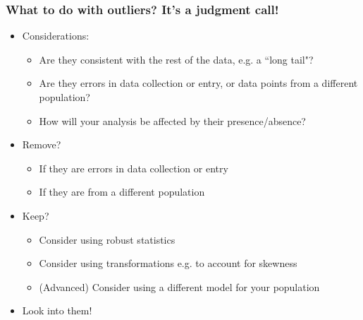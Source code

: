\documentclass[11pt,containsverbatim,handout]{beamer}
\begin{document}

\begin{frame}
\frametitle{What to do with outliers? It's a judgment call!}
\begin{itemize}
  \item Considerations:
  \begin{itemize}
    \item Are they consistent with the rest of the data, e.g. a ``long tail"?
    \item Are they errors in data collection or entry, or data points from a different population?
    \item How will your analysis be affected by their presence/absence?
  \end{itemize}
  \item Remove?
  \begin{itemize}
    \item If they are errors in data collection or entry
    \item If they are from a different population
  \end{itemize}
  \item Keep?
  \begin{itemize}
    \item Consider using robust statistics
    \item Consider using transformations e.g. to account for skewness
    \item (Advanced) Consider using a different model for your population
  \end{itemize}
  \item Look into them!
\end{itemize}
\end{frame}
\end{document}
